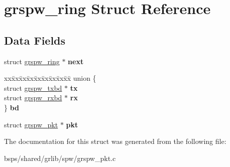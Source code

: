 \hypertarget{structgrspw__ring}{}\section{grspw\+\_\+ring Struct Reference}
\label{structgrspw__ring}
\subsection*{Data Fields}
\begin{DoxyCompactItemize}
\item 
\mbox{\label{structgrspw__ring_af3f152f2d25b27672bee7eeb11756a2e}} 
struct \mbox{\hyperlink{structgrspw__ring}{grspw\+\_\+ring}} $\ast$ {\bfseries next}
\item 
\mbox{\label{structgrspw__ring_abb14bc21e40ac216282c3b0c08ccc7d9}} 
\begin{tabbing}
xx\=xx\=xx\=xx\=xx\=xx\=xx\=xx\=xx\=\kill
union \{\\
\>struct \mbox{\hyperlink{structgrspw__txbd}{grspw\_txbd}} $\ast$ {\bfseries tx}\\
\>struct \mbox{\hyperlink{structgrspw__rxbd}{grspw\_rxbd}} $\ast$ {\bfseries rx}\\
\} {\bfseries bd}\\

\end{tabbing}\item 
\mbox{\label{structgrspw__ring_af882e940f5120bfc2ebe840096cfe892}} 
struct \mbox{\hyperlink{structgrspw__pkt}{grspw\+\_\+pkt}} $\ast$ {\bfseries pkt}
\end{DoxyCompactItemize}


The documentation for this struct was generated from the following file\+:\begin{DoxyCompactItemize}
\item 
bsps/shared/grlib/spw/grspw\+\_\+pkt.\+c\end{DoxyCompactItemize}
